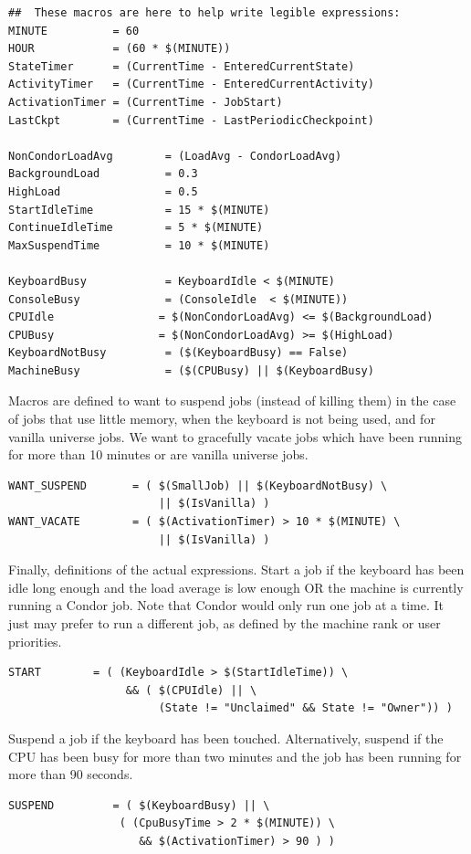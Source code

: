 \begin{verbatim}
##  These macros are here to help write legible expressions:
MINUTE          = 60
HOUR            = (60 * $(MINUTE))
StateTimer      = (CurrentTime - EnteredCurrentState)
ActivityTimer   = (CurrentTime - EnteredCurrentActivity)
ActivationTimer = (CurrentTime - JobStart)
LastCkpt        = (CurrentTime - LastPeriodicCheckpoint)

NonCondorLoadAvg        = (LoadAvg - CondorLoadAvg)
BackgroundLoad          = 0.3
HighLoad                = 0.5
StartIdleTime           = 15 * $(MINUTE)
ContinueIdleTime        = 5 * $(MINUTE)
MaxSuspendTime          = 10 * $(MINUTE)

KeyboardBusy            = KeyboardIdle < $(MINUTE)
ConsoleBusy             = (ConsoleIdle  < $(MINUTE))
CPUIdle                = $(NonCondorLoadAvg) <= $(BackgroundLoad)
CPUBusy                = $(NonCondorLoadAvg) >= $(HighLoad)
KeyboardNotBusy         = ($(KeyboardBusy) == False)
MachineBusy             = ($(CPUBusy) || $(KeyboardBusy)
\end{verbatim}

Macros are defined to want to suspend jobs (instead of
killing them) in the case of jobs that use little memory,
when the keyboard is not being used, and for vanilla universe
jobs.
We want to gracefully vacate jobs which
have been running for more than 10 minutes
or are vanilla universe jobs.
\begin{verbatim}
WANT_SUSPEND       = ( $(SmallJob) || $(KeyboardNotBusy) \
                       || $(IsVanilla) )
WANT_VACATE        = ( $(ActivationTimer) > 10 * $(MINUTE) \
                       || $(IsVanilla) )
\end{verbatim}

Finally, definitions of the actual expressions.
Start a job if 
the keyboard has been idle long enough and
the load average is low enough OR the machine is currently
running a Condor job.
Note that Condor would only run one job at a time.
It just may prefer to run a different job, as defined by
the machine rank or user priorities.
\begin{verbatim}
START        = ( (KeyboardIdle > $(StartIdleTime)) \
                  && ( $(CPUIdle) || \
                       (State != "Unclaimed" && State != "Owner")) )
\end{verbatim}

Suspend a job if the keyboard has been touched.
Alternatively, suspend if the CPU has been busy for more than two minutes
and the job has been running for more than 90 seconds.
\begin{verbatim}
SUSPEND         = ( $(KeyboardBusy) || \
                 ( (CpuBusyTime > 2 * $(MINUTE)) \
                    && $(ActivationTimer) > 90 ) )
\end{verbatim}

